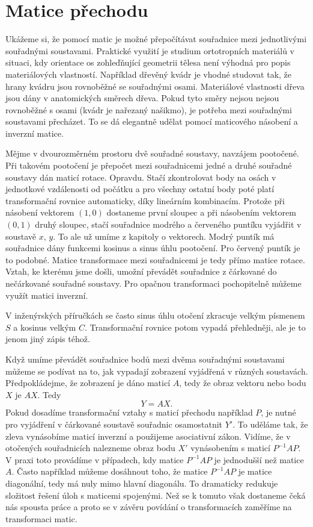 \documentclass[12pt]{article}
\begin{document}
\section*{Matice přechodu}

Ukážeme si, že pomocí matic je možné přepočítávat souřadnice mezi jednotlivými souřadnými soustavami. Praktické využití je studium ortotropních materiálů v situaci, kdy orientace os zohleďňující geometrii tělesa není výhodná pro popis materiálových vlastností. Například dřevěný kvádr je vhodné studovat tak, že hrany kvádru jsou rovnoběžné se souřadnými osami. Materiálové vlastnosti dřeva jsou dány v anatomických směrech dřeva. Pokud tyto směry nejsou nejsou rovnoběžné s osami (kvádr je nařezaný našikmo), je potřeba mezi souřadnými soustavami přecházet. To se dá elegantně udělat pomocí maticového násobení a inverzní matice. 

Mějme v dvourozměrném prostoru dvě souřadné soustavy, navzájem pootočené. Při takovém pootočení je přepočet mezi souřadnicemi jedné a druhé souřadné soustavy dán maticí rotace. Opravdu. Stačí zkontrolovat body na osách v jednotkové vzdálenosti od počátku a pro všechny ostatní body poté platí transformační rovnice automaticky, díky lineárním kombinacím. Protože při násobení vektorem $(1,0)$ dostaneme první sloupec a při násobením vektorem $(0,1)$ druhý sloupec, stačí souřadnice modrého a červeného puntíku vyjádřit v soustavě $x$, $y$. To ale už umíme z kapitoly o vektorech. Modrý puntík má souřadnice dány funkcemi kosinus a sinus úhlu pootočení. Pro červený puntík je to podobné. Matice transformace mezi souřadnicemi je tedy přímo matice rotace. Vztah, ke kterému jsme došli, umožní převádět souřadnice z čárkované do nečárkované souřadné soustavy. Pro opačnou transformaci pochopitelně můžeme využít matici inverzní.

V inženýrských příručkách se často sinus úhlu otočení zkracuje velkým písmenem $S$ a kosinus velkým $C$. Transformační rovnice potom vypadá přehledněji, ale je to jenom jiný zápis téhož.

Když umíme převádět souřadnice bodů mezi dvěma souřadnými soustavami můžeme se podívat na to, jak vypadají zobrazení vyjádřená v různých soustavách. Předpokládejme, že zobrazení je dáno maticí $A$, tedy že obraz vektoru nebo bodu  $X$ je $AX$. Tedy $$Y=AX.$$ Pokud dosadíme transformační vztahy s maticí přechodu například $P$, je nutné pro vyjádření v čárkované soustavě souřadnic osamostatnit $Y'$. To uděláme tak, že zleva vynásobíme maticí inverzní a použijeme asociativní zákon. Vidíme, že v otočených souřadnicích nalezneme obraz bodu $X'$ vynásobením s maticí $P^{-1}AP$. V praxi toto provádíme v případech, kdy matice $P^{-1}AP$ je jednodušší než matice $A$. Často například můžeme dosáhnout toho, že matice $P^{-1}AP$ je matice diagonální, tedy má nuly mimo hlavní diagonálu. To dramaticky redukuje složitost řešení úloh s maticemi spojenými. Než se k tomuto však dostaneme čeká nás spousta práce a proto se v závěru povídání o transformacích zaměříme na transformaci matic.
\end{document}
